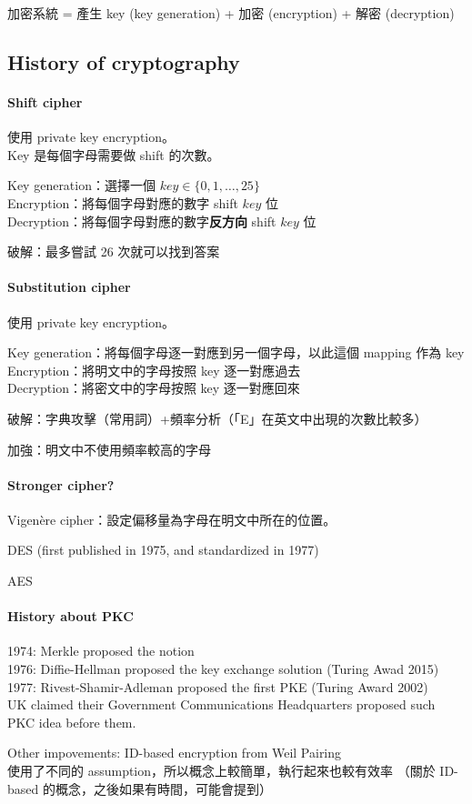 加密系統 = 產生 key (key generation) + 加密 (encryption) + 解密 (decryption)


\subsection{History of cryptography}

\paragraph{Shift cipher}

使用 private key encryption。 \\
Key 是每個字母需要做 shift 的次數。

Key generation：選擇一個  \(key \in \{0, 1, \ldots, 25\}\) \\
Encryption：將每個字母對應的數字 shift \(key\) 位 \\
Decryption：將每個字母對應的數字\textbf{反方向} shift \(key\) 位

破解：最多嘗試 26 次就可以找到答案


\paragraph{Substitution cipher}

使用 private key encryption。

Key generation：將每個字母逐一對應到另一個字母，以此這個 mapping 作為 key \\
Encryption：將明文中的字母按照 key 逐一對應過去 \\
Decryption：將密文中的字母按照 key 逐一對應回來

破解：字典攻擊（常用詞）+頻率分析（「E」在英文中出現的次數比較多）

加強：明文中不使用頻率較高的字母


\paragraph{Stronger cipher?}

Vigenère cipher：設定偏移量為字母在明文中所在的位置。

DES (first published in 1975, and standardized in 1977)

AES


\paragraph{History about PKC}

1974: Merkle proposed the notion \\
1976: Diffie-Hellman proposed the key exchange solution (Turing Awad 2015) \\
1977: Rivest-Shamir-Adleman proposed the first PKE (Turing Award 2002) \\
UK claimed their Government Communications Headquarters proposed such PKC idea before them.

Other impovements: ID-based encryption from Weil Pairing\\
使用了不同的 assumption，所以概念上較簡單，執行起來也較有效率
（關於 ID-based 的概念，之後如果有時間，可能會提到）
